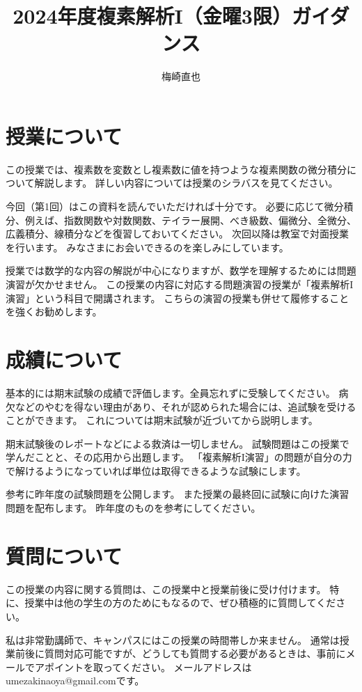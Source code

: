 \documentclass{ltjsarticle}
\title{2024年度複素解析I（金曜3限）ガイダンス}
\author{梅崎直也}
\begin{document}
\maketitle

\section*{授業について}

この授業では、複素数を変数とし複素数に値を持つような複素関数の微分積分について解説します。
詳しい内容については授業のシラバスを見てください。

今回（第1回）はこの資料を読んでいただければ十分です。
必要に応じて微分積分、例えば、指数関数や対数関数、テイラー展開、べき級数、偏微分、全微分、広義積分、線積分などを復習しておいてください。
次回以降は教室で対面授業を行います。
みなさまにお会いできるのを楽しみにしています。

授業では数学的な内容の解説が中心になりますが、数学を理解するためには問題演習が欠かせません。
この授業の内容に対応する問題演習の授業が「複素解析I演習」という科目で開講されます。
こちらの演習の授業も併せて履修することを強くお勧めします。

\section*{成績について}

基本的には期末試験の成績で評価します。全員忘れずに受験してください。
病欠などのやむを得ない理由があり、それが認められた場合には、追試験を受けることができます。
これについては期末試験が近づいてから説明します。

期末試験後のレポートなどによる救済は一切しません。
試験問題はこの授業で学んだことと、その応用から出題します。
「複素解析I演習」の問題が自分の力で解けるようになっていれば単位は取得できるような試験にします。

参考に昨年度の試験問題を公開します。
また授業の最終回に試験に向けた演習問題を配布します。
昨年度のものを参考にしてください。

\section*{質問について}

この授業の内容に関する質問は、この授業中と授業前後に受け付けます。
特に、授業中は他の学生の方のためにもなるので、ぜひ積極的に質問してください。

私は非常勤講師で、キャンパスにはこの授業の時間帯しか来ません。
通常は授業前後に質問対応可能ですが、どうしても質問する必要があるときは、事前にメールでアポイントを取ってください。
メールアドレスはumezakinaoya@gmail.comです。
\end{document}
